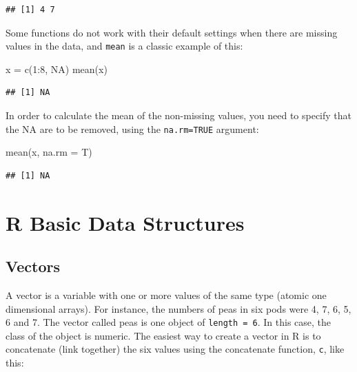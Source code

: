\documentclass[
]{book}
\newenvironment{Shaded}{\begin{snugshade}}{\end{snugshade}}
\newcommand{\AttributeTok}[1]{\textcolor[rgb]{0.77,0.63,0.00}{#1}}
\newcommand{\ConstantTok}[1]{\textcolor[rgb]{0.00,0.00,0.00}{#1}}
\newcommand{\DecValTok}[1]{\textcolor[rgb]{0.00,0.00,0.81}{#1}}
\newcommand{\FunctionTok}[1]{\textcolor[rgb]{0.00,0.00,0.00}{#1}}
\newcommand{\NormalTok}[1]{#1}
\newcommand{\OtherTok}[1]{\textcolor[rgb]{0.56,0.35,0.01}{#1}}
\newcommand{\SpecialCharTok}[1]{\textcolor[rgb]{0.00,0.00,0.00}{#1}}
\theoremstyle{definition}
\theoremstyle{definition}
\theoremstyle{definition}
\theoremstyle{definition}
\theoremstyle{remark}
\begin{document}
\begin{verbatim}
## [1] 4 7
\end{verbatim}

Some functions do not work with their default settings when there are missing values in the data, and \texttt{mean} is a classic example of this:

\begin{Shaded}
\begin{Highlighting}[]
\NormalTok{x }\OtherTok{=} \FunctionTok{c}\NormalTok{(}\DecValTok{1}\SpecialCharTok{:}\DecValTok{8}\NormalTok{, }\ConstantTok{NA}\NormalTok{)}
\FunctionTok{mean}\NormalTok{(x)}
\end{Highlighting}
\end{Shaded}

\begin{verbatim}
## [1] NA
\end{verbatim}

In order to calculate the mean of the non-missing values, you need to specify that the NA are to be removed, using the \texttt{na.rm=TRUE} argument:

\begin{Shaded}
\begin{Highlighting}[]
\FunctionTok{mean}\NormalTok{(x, }\AttributeTok{na.rm =}\NormalTok{ T)}
\end{Highlighting}
\end{Shaded}

\begin{verbatim}
## [1] NA
\end{verbatim}

\hypertarget{r-basic-data-structures}{%
\section{R Basic Data Structures}\label{r-basic-data-structures}}

\hypertarget{vectors}{%
\subsection{Vectors}\label{vectors}}

A vector is a variable with one or more values of the same type (atomic one dimensional arrays). For instance, the numbers of peas in six pods were 4, 7, 6, 5, 6 and 7. The vector called peas is one object of \texttt{length\ =\ 6}. In this case, the class of the object is numeric. The easiest way to create a vector in R is to concatenate (link together) the six values using the concatenate function, \texttt{c}, like this:
\end{document}
